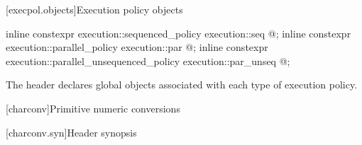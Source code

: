 [execpol.objects]{Execution policy objects}

%
%
%
%
%
%
\begin{itemdecl}
inline constexpr execution::sequenced_policy            execution::seq{ @\unspec@ };
inline constexpr execution::parallel_policy             execution::par{ @\unspec@ };
inline constexpr execution::parallel_unsequenced_policy execution::par_unseq{ @\unspec@ };
\end{itemdecl}

\begin{itemdescr}
\pnum
The header  declares global objects associated with each type of execution policy.
\end{itemdescr}

[charconv]{Primitive numeric conversions}

[charconv.syn]{Header  synopsis}

